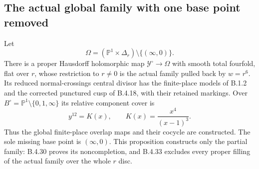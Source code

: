 \subsection{The actual global family with one base point removed}

\begin{proposition}\label{push:src:B.4.19}
\label{push:B419}
Let
\[
 \Omega=(\mathbb P^1\times\Delta_r)
                  \setminus\{(\infty,0)\}.
\]
There is a proper Hausdorff holomorphic map
$\mathcal Y^\circ\to\Omega$ with smooth total fourfold,
flat over $r$, whose restriction to $r\ne0$ is the
actual family pulled back by $w=r^6$. Its reduced
normal-crossings central divisor has the finite-place
models of B.1.2 and the corrected punctured cusp of
B.4.18, with their retained markings. Over
$B^\circ=\mathbb P^1\setminus\{0,1,\infty\}$ its
relative component cover is
\[
 y^{12}=K(x),\qquad K(x)=\frac{x^4}{(x-1)^3}.
\]
Thus the global finite-place overlap maps and their
cocycle are constructed. The sole missing base point
is $(\infty,0)$. This proposition constructs only the
partial family: B.4.30 proves its noncompletion, and
B.4.33 excludes every proper filling of the actual
family over the whole $r$ disc.
\end{proposition}

